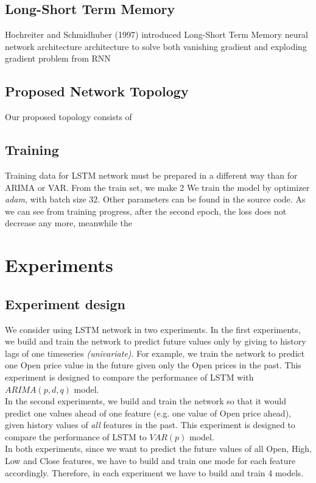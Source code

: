 \documentclass[11pt]{article}
\begin{document}
\subsection{Long-Short Term Memory}
Hochreiter and Schmidhuber (1997) \cite{gers1999learning} introduced Long-Short
Term Memory neural network architecture architecture to solve both vanishing
gradient and exploding gradient problem from RNN

\subsection{Proposed Network Topology}
Our proposed topology consists of 

\subsection{Training}
Training data for LSTM network must be prepared in a different way than for
ARIMA or VAR. From the train set, we make 2
We train the model by optimizer \textit{adam}, with batch size 32. Other
parameters can be found in the source code. As we can see from training progress, after the second epoch, the loss does not
decrease any more, meanwhile the 


\section{Experiments}
\subsection{Experiment design}
We consider using LSTM network in two experiments. In the first experiments, we
build and train the network to predict future values only by giving to history
lags of one timeseries \textit{(univariate)}. For example, we train the network to
predict one Open price value in the future given only the Open prices in the
past. This experiment is designed to compare the performance of LSTM with
$ARIMA(p, d, q)$ model.\\ 
In the second experiments, we build and train the network so that it would
predict one values ahead of one feature (e.g. one value of Open price ahead),
given history values of \textit{all} features in the past. This experiment is
designed to compare the performance of LSTM to $VAR(p)$ model.\\
In both experiments, since we want to predict the future values of all Open,
High, Low and Close features, we have to build and train one mode for each
feature accordingly. Therefore, in each experiment we have to build and train 4
models.
\end{document}
